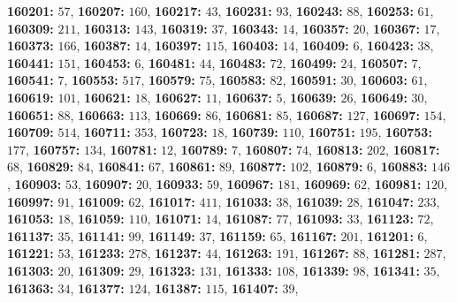 \textsf{\bfseries 160201:} $57$, \textsf{\bfseries 160207:} $160$, \textsf{\bfseries 160217:} $43$, \textsf{\bfseries 160231:} $93$, \textsf{\bfseries 160243:} $88$, \textsf{\bfseries 160253:} $61$, \textsf{\bfseries 160309:} $211$, \textsf{\bfseries 160313:} $143$, \textsf{\bfseries 160319:} $37$, \textsf{\bfseries 160343:} $14$, \textsf{\bfseries 160357:} $20$, \textsf{\bfseries 160367:} $17$, \textsf{\bfseries 160373:} $166$, \textsf{\bfseries 160387:} $14$, \textsf{\bfseries 160397:} $115$, \textsf{\bfseries 160403:} $14$, \textsf{\bfseries 160409:} $6$, \textsf{\bfseries 160423:} $38$, \textsf{\bfseries 160441:} $151$, \textsf{\bfseries 160453:} $6$, \textsf{\bfseries 160481:} $44$, \textsf{\bfseries 160483:} $72$, \textsf{\bfseries 160499:} $24$, \textsf{\bfseries 160507:} $7$, \textsf{\bfseries 160541:} $7$, \textsf{\bfseries 160553:} $517$, \textsf{\bfseries 160579:} $75$, \textsf{\bfseries 160583:} $82$, \textsf{\bfseries 160591:} $30$, \textsf{\bfseries 160603:} $61$, \textsf{\bfseries 160619:} $101$, \textsf{\bfseries 160621:} $18$, \textsf{\bfseries 160627:} $11$, \textsf{\bfseries 160637:} $5$, \textsf{\bfseries 160639:} $26$, \textsf{\bfseries 160649:} $30$, \textsf{\bfseries 160651:} $88$, \textsf{\bfseries 160663:} $113$, \textsf{\bfseries 160669:} $86$, \textsf{\bfseries 160681:} $85$, \textsf{\bfseries 160687:} $127$, \textsf{\bfseries 160697:} $154$, \textsf{\bfseries 160709:} $514$, \textsf{\bfseries 160711:} $353$, \textsf{\bfseries 160723:} $18$, \textsf{\bfseries 160739:} $110$, \textsf{\bfseries 160751:} $195$, \textsf{\bfseries 160753:} $177$, \textsf{\bfseries 160757:} $134$, \textsf{\bfseries 160781:} $12$, \textsf{\bfseries 160789:} $7$, \textsf{\bfseries 160807:} $74$, \textsf{\bfseries 160813:} $202$, \textsf{\bfseries 160817:} $68$, \textsf{\bfseries 160829:} $84$, \textsf{\bfseries 160841:} $67$, \textsf{\bfseries 160861:} $89$, \textsf{\bfseries 160877:} $102$, \textsf{\bfseries 160879:} $6$, \textsf{\bfseries 160883:} $146$, \textsf{\bfseries 160903:} $53$, \textsf{\bfseries 160907:} $20$, \textsf{\bfseries 160933:} $59$, \textsf{\bfseries 160967:} $181$, \textsf{\bfseries 160969:} $62$, \textsf{\bfseries 160981:} $120$, \textsf{\bfseries 160997:} $91$, \textsf{\bfseries 161009:} $62$, \textsf{\bfseries 161017:} $411$, \textsf{\bfseries 161033:} $38$, \textsf{\bfseries 161039:} $28$, \textsf{\bfseries 161047:} $233$, \textsf{\bfseries 161053:} $18$, \textsf{\bfseries 161059:} $110$, \textsf{\bfseries 161071:} $14$, \textsf{\bfseries 161087:} $77$, \textsf{\bfseries 161093:} $33$, \textsf{\bfseries 161123:} $72$, \textsf{\bfseries 161137:} $35$, \textsf{\bfseries 161141:} $99$, \textsf{\bfseries 161149:} $37$, \textsf{\bfseries 161159:} $65$, \textsf{\bfseries 161167:} $201$, \textsf{\bfseries 161201:} $6$, \textsf{\bfseries 161221:} $53$, \textsf{\bfseries 161233:} $278$, \textsf{\bfseries 161237:} $44$, \textsf{\bfseries 161263:} $191$, \textsf{\bfseries 161267:} $88$, \textsf{\bfseries 161281:} $287$, \textsf{\bfseries 161303:} $20$, \textsf{\bfseries 161309:} $29$, \textsf{\bfseries 161323:} $131$, \textsf{\bfseries 161333:} $108$, \textsf{\bfseries 161339:} $98$, \textsf{\bfseries 161341:} $35$, \textsf{\bfseries 161363:} $34$, \textsf{\bfseries 161377:} $124$, \textsf{\bfseries 161387:} $115$, \textsf{\bfseries 161407:} $39$, 
